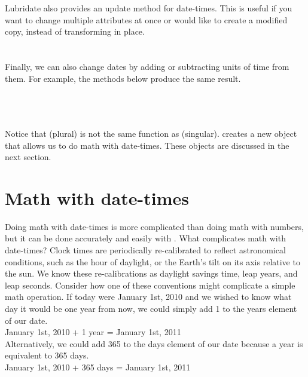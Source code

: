 \documentclass[article]{jss}
\begin{document}
Lubridate also provides an update method for date-times.  This is useful if you want to change multiple attributes at once or would like to create a modified copy, instead of transforming in place.\\

\\
\\

Finally, we can also change dates by adding or subtracting units of time from them. For example, the methods below produce the same result.\\

\\

\\
\\

Notice that  (plural) is not the same function as  (singular).  creates a new object that allows us to do math with date-times. These objects are discussed in the next section. 

\section{Math with date-times}
\label{sec:types}
Doing math with date-times is more complicated than doing math with numbers, but it can be done accurately and easily with . What complicates math with date-times? Clock times are periodically re-calibrated to reflect astronomical conditions, such as the hour of daylight, or the Earth's tilt on its axis relative to the sun. We know these re-calibrations as daylight savings time, leap years, and leap seconds. Consider how one of these conventions might complicate a simple math operation. If today were January 1st, 2010 and we wished to know what day it would be one year from now, we could simply add 1 to the years element of our date.\\

January 1st, 2010 + 1 year = January 1st, 2011\\

Alternatively, we could add 365 to the days element of our date because a year is equivalent to 365 days. \\

January 1st, 2010 + 365 days = January 1st, 2011\\
\end{document}
